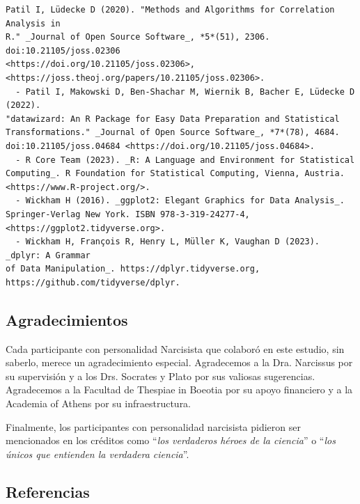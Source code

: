 \documentclass[
  10pt]{article}
\begin{document}
\begin{tcolorbox}[enhanced jigsaw, colframe=quarto-callout-color-frame, arc=.35mm, rightrule=.15mm, colback=white, bottomrule=.15mm, toprule=.15mm, leftrule=.75mm, left=2mm, breakable, opacityback=0]
\begin{verbatim}
Patil I, Lüdecke D (2020). "Methods and Algorithms for Correlation Analysis in
R." _Journal of Open Source Software_, *5*(51), 2306. doi:10.21105/joss.02306
<https://doi.org/10.21105/joss.02306>,
<https://joss.theoj.org/papers/10.21105/joss.02306>.
  - Patil I, Makowski D, Ben-Shachar M, Wiernik B, Bacher E, Lüdecke D (2022).
"datawizard: An R Package for Easy Data Preparation and Statistical
Transformations." _Journal of Open Source Software_, *7*(78), 4684.
doi:10.21105/joss.04684 <https://doi.org/10.21105/joss.04684>.
  - R Core Team (2023). _R: A Language and Environment for Statistical
Computing_. R Foundation for Statistical Computing, Vienna, Austria.
<https://www.R-project.org/>.
  - Wickham H (2016). _ggplot2: Elegant Graphics for Data Analysis_.
Springer-Verlag New York. ISBN 978-3-319-24277-4,
<https://ggplot2.tidyverse.org>.
  - Wickham H, François R, Henry L, Müller K, Vaughan D (2023). _dplyr: A Grammar
of Data Manipulation_. https://dplyr.tidyverse.org,
https://github.com/tidyverse/dplyr.
\end{verbatim}

\end{tcolorbox}

\subsection{Agradecimientos}\label{agradecimientos}

Cada participante con personalidad Narcisista que colaboró en este
estudio, sin saberlo, merece un agradecimiento especial. Agradecemos a
la Dra. Narcissus por su supervisión y a los Drs. Socrates y Plato por
sus valiosas sugerencias. Agradecemos a la Facultad de Thespiae in
Boeotia por su apoyo financiero y a la Academia of Athens por su
infraestructura.

Finalmente, los participantes con personalidad narcisista pidieron ser
mencionados en los créditos como ``\emph{los verdaderos héroes de la
ciencia}'' o ``\emph{los únicos que entienden la verdadera ciencia}''.

\subsection*{Referencias}\label{referencias}
\end{document}
